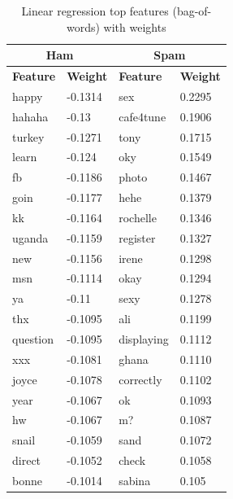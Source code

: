 \documentclass[preprint]{acm_proc_article-sp}
\begin{document}
\begin{table}
\small
\begin{tabular}{l|l||l|l}
\multicolumn{2}{c}{\textbf{Ham}} & 
\multicolumn{2}{c}{\textbf{Spam}} \\
\hline
\textbf{Feature} & \textbf{Weight} & \textbf{Feature} & \textbf{Weight} \\
\hline
happy & -0.1314 & sex & 0.2295\\
hahaha & -0.13 & cafe4tune & 0.1906\\
turkey & -0.1271 & tony & 0.1715\\
learn & -0.124 & oky & 0.1549\\
fb & -0.1186 & photo & 0.1467\\
goin & -0.1177 & hehe & 0.1379\\
kk & -0.1164 & rochelle & 0.1346\\
uganda & -0.1159 & register & 0.1327\\
new & -0.1156 & irene & 0.1298\\
msn & -0.1114 & okay & 0.1294\\
ya & -0.11 & sexy & 0.1278\\
thx & -0.1095 & ali & 0.1199\\
question & -0.1095 & displaying & 0.1112\\
xxx & -0.1081 & ghana & 0.1110\\
joyce & -0.1078 & correctly & 0.1102\\
year & -0.1067 & ok & 0.1093\\
hw & -0.1067 & m? & 0.1087\\
snail & -0.1059 & sand & 0.1072\\
direct & -0.1052 & check & 0.1058\\
bonne & -0.1014 & sabina & 0.105\\
\end{tabular}
\caption{Linear regression top features (bag-of-words) with weights}
\label{tab:lrfeats}
\end{table}
\end{document}
